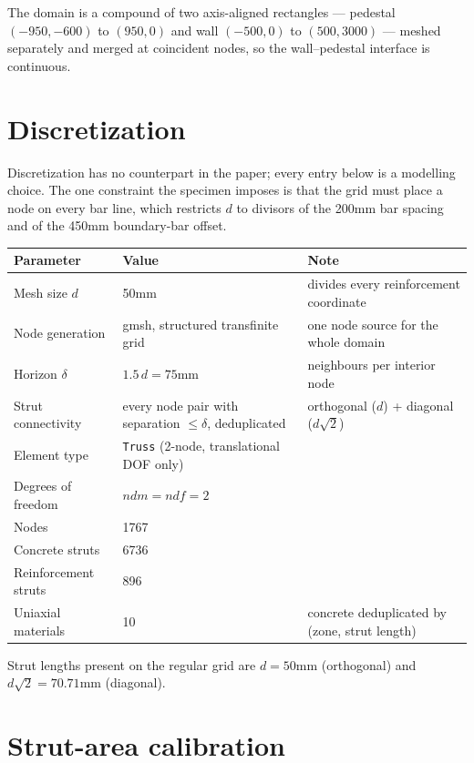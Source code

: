 \documentclass[11pt,a4paper]{article}
\begin{document}
The domain is a compound of two axis-aligned rectangles --- pedestal $(-950,-600)$ to $(950,0)$ and
wall $(-500,0)$ to $(500,3000)$ --- meshed separately and merged at coincident nodes, so the
wall--pedestal interface is continuous.

\section{Discretization}

Discretization has no counterpart in the paper; every entry below is a modelling choice. The one
constraint the specimen imposes is that the grid must place a node on every bar line, which
restricts $d$ to divisors of the 200\unit{mm} bar spacing and of the 450\unit{mm} boundary-bar
offset.

\begin{tabularx}{\textwidth}{@{}p{50mm}p{38mm}>{\raggedright\arraybackslash}X@{}}
\toprule
\textbf{Parameter} & \textbf{Value} & \textbf{Note} \\
\midrule
Mesh size $d$          & 50\unit{mm}   & divides every reinforcement coordinate \\
Node generation        & gmsh, structured transfinite grid & one node source for the whole domain \\
Horizon $\delta$       & $1.5\,d = 75$\unit{mm} & 8 neighbours per interior node \\
Strut connectivity     & every node pair with separation $\le \delta$, deduplicated & orthogonal ($d$) + diagonal ($d\sqrt2$) \\
Element type           & \texttt{Truss} (2-node, translational DOF only) & \\
Degrees of freedom     & $ndm = ndf = 2$ & \\
Nodes                  & 1767 & \\
Concrete struts        & 6736 & \\
Reinforcement struts   & 896  & \\
Uniaxial materials     & 10   & concrete deduplicated by (zone, strut length) \\
\bottomrule
\end{tabularx}

Strut lengths present on the regular grid are $d = 50$\unit{mm} (orthogonal) and
$d\sqrt2 = 70.71$\unit{mm} (diagonal).

\section{Strut-area calibration}
\end{document}
